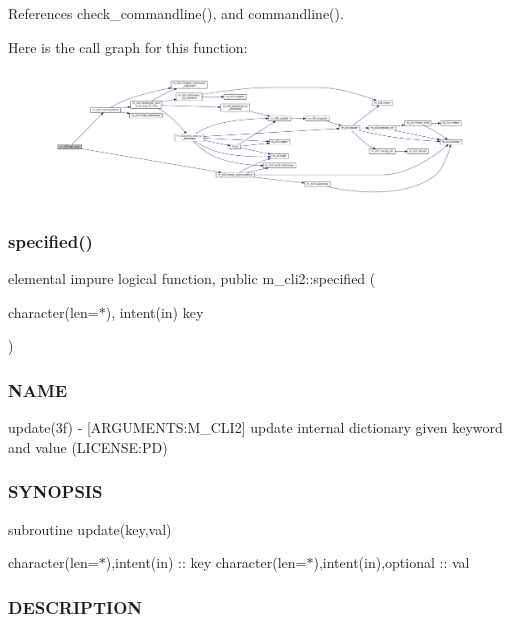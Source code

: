 References check\+\_\+commandline(), and commandline().

Here is the call graph for this function\+:\nopagebreak
\begin{figure}[H]
\begin{center}
\leavevmode
\includegraphics[width=350pt]{namespacem__cli2_a6d20994aa80217dd3d0ffd1d5586f736_cgraph}
\end{center}
\end{figure}
\mbox{\label{namespacem__cli2_a90118f308a5120041a5862fca4740367}} 
\subsubsection{\texorpdfstring{specified()}{specified()}}
{\footnotesize\ttfamily elemental impure logical function, public m\+\_\+cli2\+::specified (\begin{DoxyParamCaption}\item[{character(len=$\ast$), intent(in)}]{key }\end{DoxyParamCaption})}



\subsubsection*{N\+A\+ME}

update(3f) -\/ \mbox{[}A\+R\+G\+U\+M\+E\+N\+TS\+:M\+\_\+\+C\+L\+I2\mbox{]} update internal dictionary given keyword and value (L\+I\+C\+E\+N\+SE\+:PD) \subsubsection*{S\+Y\+N\+O\+P\+S\+IS}

subroutine update(key,val)

character(len=$\ast$),intent(in) \+:\+: key character(len=$\ast$),intent(in),optional \+:\+: val \subsubsection*{D\+E\+S\+C\+R\+I\+P\+T\+I\+ON}


